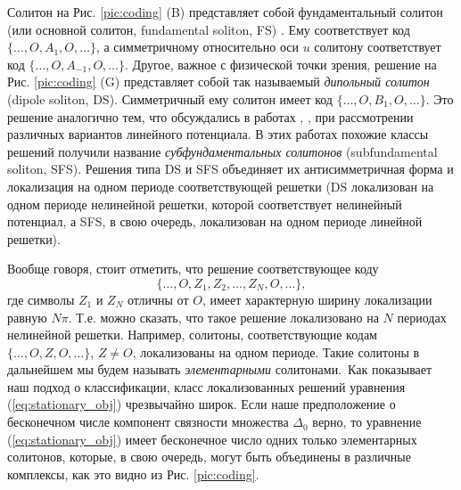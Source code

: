 Солитон на Рис. \ref{pic:coding} (B) представляет собой фундаментальный солитон (или основной солитон, fundamental soliton, FS) \citep{Malomed}.
Ему соответствует код $\{ \dots, O, A_1, O, \dots \}$, а симметричному относительно оси $u$ солитону соответствует код $\{ \dots, O, A_{-1}, O, \dots \}$.
Другое, важное с физической точки зрения, решение на Рис. \ref{pic:coding} (G) представляет собой так называемый {\it дипольный солитон} (dipole soliton, DS).
Симметричный ему солитон имеет код $\{ \dots, O, B_1, O, \dots \}$.
Это решение аналогично тем, что обсуждались в работах \cite{SFS1}, \cite{SFS2}, \cite{SFS3} при рассмотрении различных вариантов линейного потенциала.
В этих работах похожие классы решений получили название {\it субфундаментальных солитонов} (subfundamental soliton, SFS).
Решения типа DS и SFS объединяет их антисимметричная форма и локализация на одном периоде соответствующей решетки (DS локализован на одном периоде нелинейной решетки, которой соответствует нелинейный потенциал, а SFS, в свою очередь, локализован на одном периоде линейной решетки).

Вообще говоря, стоит отметить, что решение соответствующее коду
%
\begin{equation*}
\{ \dots, O, Z_1, Z_2, \dots, Z_N, O, \dots \},
\end{equation*}
%
где символы $Z_1$ и $Z_N$ отличны от $O$, имеет характерную ширину локализации равную $N\pi$.
Т.е. можно сказать, что такое решение локализовано на $N$ периодах нелинейной решетки.
Например, солитоны, соответствующие кодам $\{ \dots, O, Z, O, \dots \}$, $Z \neq O$, локализованы на одном периоде.
Такие солитоны в дальнейшем мы будем называть {\it элементарными} солитонами.\
Как показывает наш подход о классификации, класс локализованных решений уравнения (\ref{eq:stationary_obj}) чрезвычайно широк.
Если наше предположение о бесконечном числе компонент связности множества $\Delta_0$ верно, то уравнение (\ref{eq:stationary_obj}) имеет бесконечное число одних только элементарных солитонов, которые, в свою очередь, могут быть объединены в различные комплексы, как это видно из Рис. \ref{pic:coding}.